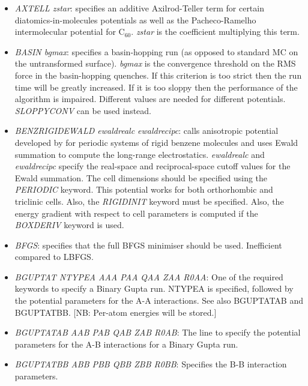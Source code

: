 \documentclass[12pt,a4paper,dvips]{article}
\begin{document}
\begin{itemize}
\item {\it AXTELL zstar\/}: specifies an additive Axilrod-Teller term for certain
diatomics-in-molecules potentials as well as the Pacheco-Ramelho intermolecular potential for
C$_{60}$.\cite{pachecor97} 
{\it zstar\/} is the coefficient multiplying this term.

\item {\it BASIN bgmax\/}: specifies a basin-hopping run (as opposed to standard MC
on the untransformed surface). {\it bgmax\/} is the convergence threshold
on the RMS force in the basin-hopping
quenches. If this criterion is too strict then the run time will be greatly increased.
If it is too sloppy then the performance of the algorithm is impaired. Different values
are needed for different potentials. {\it SLOPPYCONV} can be used instead.

\item{\it BENZRIGIDEWALD ewaldrealc ewaldrecipc\/}: calls anisotropic potential developed by \cite{TottonMK10}
for periodic systems of rigid benzene molecules and uses Ewald summation to compute the long-range electrostatics.
{\it ewaldrealc\/} and {\it ewaldrecipc\/} specify the real-space and reciprocal-space cutoff values for
the Ewald summation. The cell dimensions should be specified using the {\it PERIODIC\/} keyword. This potential
works for both orthorhombic and triclinic cells. Also, the {\it RIGIDINIT\/} keyword must be specified. Also, the 
energy gradient with respect to cell parameters is computed if the {\it BOXDERIV\/} keyword is used.

\item {\it BFGS}: specifies that the full BFGS minimiser should be used. Inefficient compared to LBFGS.

\item {\it BGUPTAT NTYPEA AAA PAA QAA ZAA R0AA}: One of the required keywords to specify a Binary Gupta run. 
NTYPEA is specified, followed by the potential parameters for the A-A interactions. See also BGUPTATAB and BGUPTATBB.
[NB: Per-atom energies will be stored.]

\item {\it BGUPTATAB AAB PAB QAB ZAB R0AB}: The line to specify the potential parameters for the A-B interactions 
for a Binary Gupta run.

\item {\it BGUPTATBB ABB PBB QBB ZBB R0BB}: Specifies the B-B interaction parameters.


\end{itemize}
\end{document}
